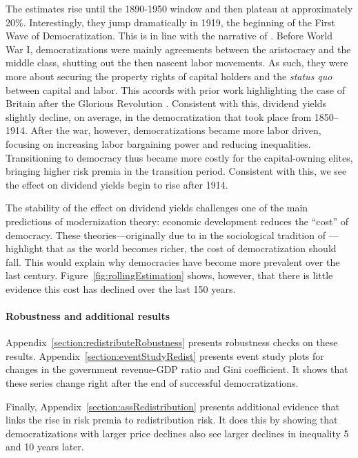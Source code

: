 

The estimates rise until the 1890-1950 window and then plateau at approximately 20\%. Interestingly, they  jump dramatically  in 1919, the beginning of the First Wave of Democratization. This is in line with the narrative of \cite{Luebbert1991}. Before World War I, democratizations were mainly agreements between the aristocracy and the middle class, shutting out the then nascent labor movements. As such, they were more about securing the property rights of capital holders and the \textit{status quo} between capital and labor. This accords with prior work highlighting the case of Britain after the Glorious Revolution \citep{North1989,Acemoglu2006}. Consistent with this, dividend yields slightly decline, on average, in the democratization that took place from 1850--1914. After the war, however, democratizations became more labor driven, focusing on increasing labor bargaining power and reducing inequalities. Transitioning to democracy thus became more costly for the capital-owning elites, bringing higher risk premia in the transition period. Consistent with this, we see the effect on dividend yields begin to rise after 1914.

The stability of the effect on dividend yields challenges one of the main predictions of modernization theory: economic development reduces the ``cost'' of democracy.  These theories---originally due to \cite{Lipset1959} in the sociological tradition of \cite{Weber1946}---highlight that as the world becomes richer, the cost of democratization should fall. This would explain why democracies have become more prevalent over the last century. Figure~\ref{fig:rollingEstimation} shows, however, that there is little evidence this cost has declined over the last 150 years.

\paragraph{Robustness and additional results}

Appendix~\ref{section:redistributeRobustness} presents robustness checks on these results. Appendix~\ref{section:eventStudyRedist} presents event study plots for changes in the government revenue-GDP ratio and Gini coefficient. It shows that these series change right after the end of successful democratizations.

Finally, Appendix~\ref{section:assRedistribution} presents additional evidence that links the rise in risk premia to redistribution risk. It does this by showing that democratizations with larger price declines also see larger declines in inequality 5 and 10 years later.
